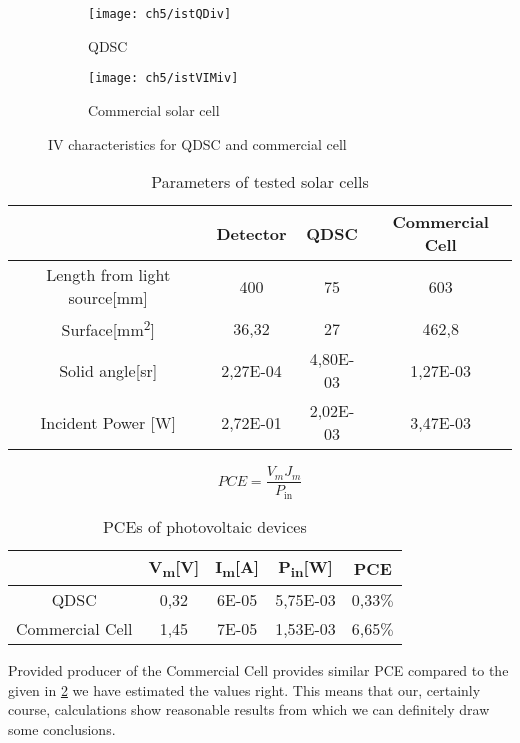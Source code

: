 \begin{figure}[b]
	\centering
	\begin{subfigure}[b]{0.49\textwidth}
	\centering
	\texttt{[image: ch5/istQDiv]}
	\caption{QDSC}
	\end{subfigure}
	\hfill
	\begin{subfigure}[b]{0.49\textwidth}
	\centering
	\texttt{[image: ch5/istVIMiv]}
	\caption{Commercial solar cell}{}
	\end{subfigure}
	\caption{IV characteristics for QDSC and commercial cell }
\end{figure}

\begin{table}[ht]
\centering
\begin{tabular}{|c |c | c | c |}
\hline
& Detector & QDSC & Commercial Cell\\
\hline
Length from light source{[}mm{]} & 400 & 75 & 603\\
\hline
Surface{[}mm\textsuperscript{2}{]} & 36,32 & 27 & 462,8\\
\hline
Solid angle{[}sr{]} & 2,27E-04 & 4,80E-03 & 1,27E-03\\
\hline
Incident Power {[}W{]} & 2,72E-01 & 2,02E-03 & 3,47E-03\\
\hline
\end{tabular}
\caption{Parameters of tested solar cells}
\label{tab:1stparam}
\end{table}

\begin{equation}
PCE = \frac{V_{m}J_{m}}{P_{\text{in}}}
\end{equation}

\begin{table}[ht]
\centering
\begin{tabular}{|c |c |c | c | c|}
\hline
& V\textsubscript{m}{[}V{]} & I\textsubscript{m}{[}A{]} &P\textsubscript{in}{[}W{]} & PCE\\
\hline
QDSC & 0,32 & 6E-05 & 5,75E-03 & 0,33$\%$\\
\hline
Commercial Cell & 1,45 & 7E-05 & 1,53E-03 & 6,65$\%$\\
\hline
\end{tabular}
\caption{PCEs of photovoltaic devices}
\label{tab:1stPCE}
\end{table}

Provided producer of the Commercial Cell provides similar PCE compared to the given in \ref{tab:1stPCE} \cite{vimun} we have estimated the values right. This means that our, certainly course, calculations show reasonable results from which we can definitely draw some conclusions.

